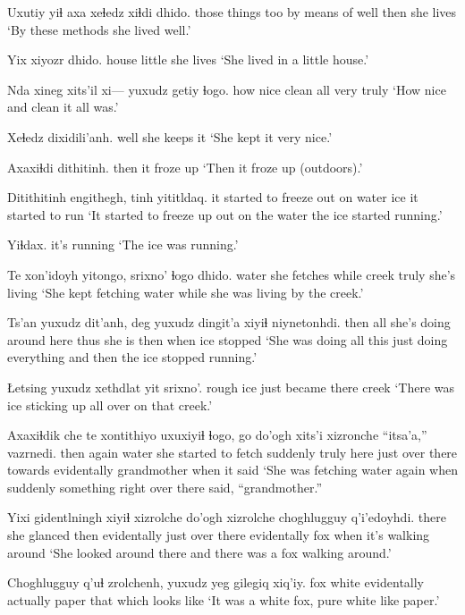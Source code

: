 \documentclass[12pt]{article}
\begin{document}
\gll Uxutiy yiɬ axa xeɬedz xiɬdi dhido.
{those things} too {by means of} well then {she lives}
\glt `By these methods she lived well.'
\glend

\gll Yix xiyozr dhido.
house little {she lives}
\glt `She lived in a little house.'
\glend

\gll Nda xineg xits'il xi--- yuxudz getiy ɬogo. 
how nice clean {} all very truly
\glt `How nice and clean it all was.'
\glend

\gll Xeɬedz dixidili'anh.
well {she keeps it}
\glt `She kept it very nice.'
\glend

\gll Axaxiɬdi dithitinh.
then {it froze up}
\glt `Then it froze up (outdoors).'
\glend

\gll Ditithitinh engithegh, tinh yititldaq.
{it started to freeze} {out on water} ice {it started to run}
\glt `It started to freeze up out on the water the ice started running.'
\glend

\gll Yiɬdax.
{{it's running}}
\glt `The ice was running.'
\glend

\gll Te xon'idoyh yitongo, srixno' ɬogo dhido.
water {she fetches} while creek truly {she's living}
\glt `She kept fetching water while she was living by the creek.'
\glend

\gll Ts'an yuxudz dit'anh, deg yuxudz dingit'a xiyiɬ niynetonhdi.
then all {she's doing} {around here} thus {she is} then {when ice stopped}
\glt `She was doing all this just doing everything and then the ice stopped running.'
\glend

\gll Łetsing yuxudz xethdlat yit srixno'.
{rough ice} just became there creek
\glt `There was ice sticking up all over on that creek.'
\glend

\gll Axaxiɬdik che te xontithiyo uxuxiyiɬ ɬogo, go do'ogh xits'i xizronche ``itsa'a,'' vazrnedi.
then again water {she started to fetch} suddenly truly here {just over there} towards evidentally grandmother {when it said}
\glt `She was fetching water again when suddenly something right over there said, ``grandmother.''
\glend

\gll Yixi gidentlningh xiyiɬ xizrolche do'ogh xizrolche choghlugguy q'i'edoyhdi.
there {she glanced} then evidentally {just over there} evidentally fox {when it's walking around}
\glt `She looked around there and there was a fox walking around.'
\glend

\gll Choghlugguy q'uɬ zrolchenh, {yuxudz yeg} gilegiq xiq'iy.
fox white evidentally actually paper {that which looks like}
\glt `It was a white fox, pure white like paper.' 
\glend
\end{document}
